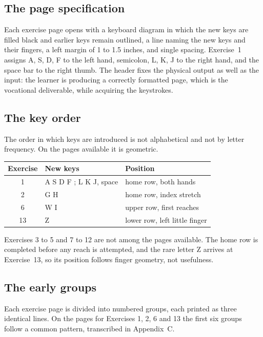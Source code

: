 \subsection{The page specification}

Each exercise page opens with a keyboard diagram in which the new keys are filled black and earlier keys remain outlined, a line naming the new keys and their fingers, a left margin of 1 to 1.5 inches, and single spacing. Exercise~1 assigns A, S, D, F to the left hand, semicolon, L, K, J to the right hand, and the space bar to the right thumb. The header fixes the physical output as well as the input: the learner is producing a correctly formatted page, which is the vocational deliverable, while acquiring the keystrokes.

\subsection{The key order}

The order in which keys are introduced is not alphabetical and not by letter frequency. On the pages available it is geometric.

\begin{center}
\begin{tabular}{@{}clp{6.5cm}@{}}
\toprule
Exercise & New keys & Position \\
\midrule
1 & A S D F ; L K J, space & home row, both hands \\
2 & G H & home row, index stretch \\
6 & W I & upper row, first reaches \\
13 & Z & lower row, left little finger \\
\bottomrule
\end{tabular}
\end{center}

Exercises 3 to 5 and 7 to 12 are not among the pages available. The home row is completed before any reach is attempted, and the rare letter Z arrives at Exercise~13, so its position follows finger geometry, not usefulness.

\subsection{The early groups}

Each exercise page is divided into numbered groups, each printed as three identical lines. On the pages for Exercises 1, 2, 6 and 13 the first six groups follow a common pattern, transcribed in Appendix~C.

